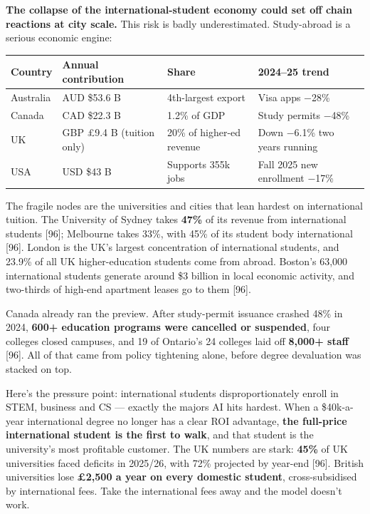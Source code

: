 \documentclass[11pt,a4paper]{article}
\begin{document}
\textbf{The collapse of the international-student economy could set off chain reactions at city scale.} This risk is badly underestimated. Study-abroad is a serious economic engine:

\begin{center}

\begin{tabularx}{\textwidth}{lXXX}
\toprule
Country & Annual contribution & Share & 2024--25 trend \\
\midrule
Australia & AUD \$53.6 B & 4th-largest export & Visa apps $-$28\% \\
Canada & CAD \$22.3 B & 1.2\% of GDP & Study permits $-$48\% \\
UK & GBP £9.4 B (tuition only) & 20\% of higher-ed revenue & Down $-$6.1\% two years running \\
USA & USD \$43 B & Supports 355k jobs & Fall 2025 new enrollment $-$17\% \\
\bottomrule
\end{tabularx}
\end{center}

The fragile nodes are the universities and cities that lean hardest on international tuition. The University of Sydney takes \textbf{47\%} of its revenue from international students [96]; Melbourne takes 33\%, with 45\% of its student body international [96]. London is the UK's largest concentration of international students, and 23.9\% of all UK higher-education students come from abroad. Boston's 63,000 international students generate around \$3 billion in local economic activity, and two-thirds of high-end apartment leases go to them [96].

Canada already ran the preview. After study-permit issuance crashed 48\% in 2024, \textbf{600+ education programs were cancelled or suspended}, four colleges closed campuses, and 19 of Ontario's 24 colleges laid off \textbf{8,000+ staff}{} [96]. All of that came from policy tightening alone, before degree devaluation was stacked on top.

Here's the pressure point: international students disproportionately enroll in STEM, business and CS --- exactly the majors AI hits hardest. When a \$40k-a-year international degree no longer has a clear ROI advantage, \textbf{the full-price international student is the first to walk}, and that student is the university's most profitable customer. The UK numbers are stark: \textbf{45\%} of UK universities faced deficits in 2025/26, with 72\% projected by year-end [96]. British universities lose \textbf{£2,500 a year on every domestic student}, cross-subsidised by international fees. Take the international fees away and the model doesn't work.
\end{document}
